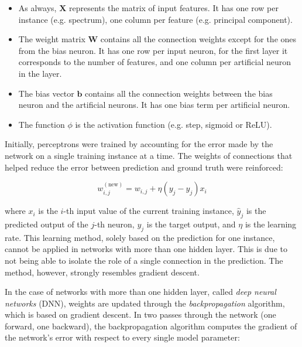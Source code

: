 \begin{itemize}
    \item As always, $\mathbf{X}$ represents the matrix of input features. It has one row per instance (e.g. spectrum), one column per feature (e.g. principal component).
    \item The weight matrix $\mathbf{W}$ contains all the connection weights except for the ones from the bias neuron. It has one row per input neuron, for the first layer it corresponds to the number of features, and one column per artificial neuron in the layer.
    \item The bias vector $\mathbf{b}$ contains all the connection weights between the bias neuron and the artificial neurons. It has one bias term per artificial neuron.
    \item The function $\phi$ is the activation function (e.g. step, sigmoid or ReLU).
\end{itemize}

Initially, perceptrons were trained by accounting for the error made by the network on a single training instance at a time. The weights of connections that helped reduce the error between prediction and ground truth were reinforced:

\begin{equation}
    w_{i,j}^{(\text{new})} = w_{i,j} + \eta \left( y_j - \hat{y}_j \right) x_i
    \label{eq:perceptron_update}
\end{equation}

where $x_i$ is the $i$-th input value of the current training instance, $\hat{y}_j$ is the predicted output of the $j$-th neuron, $y_j$ is the target output, and $\eta$ is the learning rate.
This learning method, solely based on the prediction for one instance, cannot be applied in networks with more than one hidden layer. This is due to not being able to isolate the role of a single connection in the prediction. The method, however, strongly resembles gradient descent.

In the case of networks with more than one hidden layer, called \textit{deep neural networks} (DNN), weights are updated through the \textit{backpropagation} algorithm, which is based on gradient descent. In two passes through the network (one forward, one backward), the backpropagation algorithm computes the gradient of the network's error with respect to every single model parameter:

